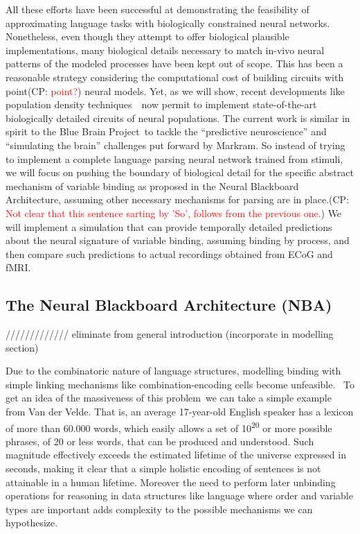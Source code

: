 \documentclass[10pt]{article}
\newcommand{\noteCP}[1]{(CP: \textcolor{red}{#1})}
\begin{document}
All these efforts have been successful at demonstrating the
feasibility of approximating language tasks with biologically
constrained neural networks. Nonetheless, even though they attempt to
offer biological plausible implementations, many biological details
necessary to match in-vivo neural patterns of the modeled processes
have been kept out of scope. This has been a reasonable strategy
considering the computational cost of building circuits with
point\noteCP{point?} neural models. Yet, as we will show, recent
developments like population density
techniques~\cite{de2013generica}~now permit to implement
state-of-the-art biologically detailed circuits of neural populations.
The current work is similar in spirit to the Blue Brain
Project\cite{Markram_2006}~to tackle the ``predictive neuroscience''
and ``simulating the brain'' challenges put forward by
Markram\cite{markram2013seven}. So instead of trying to implement a
complete language parsing neural network trained from stimuli, we will
focus on pushing the boundary of biological detail for the specific
abstract mechanism of variable binding as proposed in the Neural
Blackboard Architecture\cite{van_der_Velde_2006}, assuming other
necessary mechanisms for parsing are in place.\noteCP{Not clear that
  this sentence sarting by 'So', follows from the previous one.} We
will implement a simulation that can provide temporally detailed
predictions about the neural signature of variable binding, assuming
binding by process, and then compare such predictions to actual
recordings obtained from ECoG and fMRI.

\subsection{The Neural Blackboard Architecture (NBA)}

{\label{935508}}

///////////// eliminate from general introduction (incorporate in modelling section)

Due to the combinatoric nature of language structures, modelling binding with simple linking mechanisms like combination-encoding cells become
unfeasible\cite{von_der_Malsburg_1999}. ~To get an idea of the
massiveness of this problem~we can take a simple example from Van der
Velde\cite{van_der_Velde_2006}. That is, an average 17-year-old
English speaker has a lexicon of more than 60.000 words, which easily
allows a set of 10\textsuperscript{20} or more possible phrases, of 20
or less words, that can be produced and understood. Such magnitude
effectively exceeds the estimated lifetime of the universe expressed
in seconds, making it clear that a simple holistic encoding of
sentences is not attainable in a human lifetime. Moreover the need to perform later unbinding operations for reasoning in data structures like language where order and variable types are important adds complexity to the possible mechanisms we can hypothesize.
\end{document}
